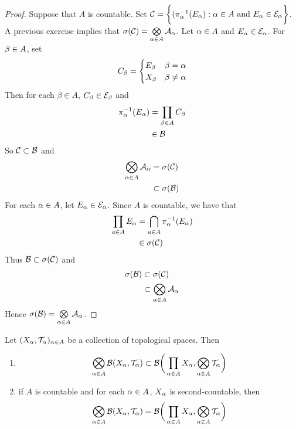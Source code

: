 \documentclass{book}
\begin{document}
 	\begin{proof}
 		Suppose that $A$ is countable. Set $\mathcal{C} =  \bigg \{ (\pi_{\alpha}^{-1}(E_{\alpha}): \alpha \in A \text{ and }E_{\alpha} \in \mathcal{E}_{\alpha} \bigg \}$. A previous exercise implies that $\sigma(\mathcal{C}) = \bigotimes\limits_{\alpha \in A} \mathcal{A}_{\alpha}$. Let $\alpha \in A$ and $E_{\alpha} \in \mathcal{E}_{\alpha}$. For $\beta \in A$, set 
 		\[
 		C_{\beta} = 
 		\begin{cases}
 			E_{\beta} & \beta = \alpha \\
 			X_{\beta} & \beta \neq \alpha
 		\end{cases}
 		\]
 		Then for each $\beta \in A$, $C_{\beta} \in \mathcal{E}_{\beta}$ and
 		\begin{align*}
 			\pi_{\alpha}^{-1}(E_{\alpha}) 
 			& = \prod_{\beta \in A} C_{\beta} \\
 			& \in \mathcal{B}
 		\end{align*}
 		So $\mathcal{C} \subset \mathcal{B}$ and 
 		\begin{align*}
 			\bigotimes\limits_{\alpha \in A} \mathcal{A}_{\alpha}
 			& = \sigma(\mathcal{C}) \\
 			& \subset \sigma(\mathcal{B})
 		\end{align*}
 		For each $\alpha \in A$, let $E_{\alpha} \in \mathcal{E}_{\alpha}$. Since $A$ is countable, we have that 
 		\begin{align*}
 			\prod_{a \in A} E_{\alpha} 
 			& = \bigcap_{a \in A} \pi_{\alpha}^{-1}(E_{\alpha}) \\
 			& \in \sigma(\mathcal{C}) 
 		\end{align*}
 		Thus $\mathcal{B} \subset \sigma(\mathcal{C})$ and 
 		\begin{align*}
 			\sigma(\mathcal{B})
 			& \subset \sigma(\mathcal{C}) \\ 
 			& \subset \bigotimes\limits_{\alpha \in A} \mathcal{A}_{\alpha} 
 		\end{align*}
 		Hence $\sigma(\mathcal{B}) = \bigotimes\limits_{\alpha \in A} \mathcal{A}_{\alpha}$.
 	\end{proof}
 
 	\begin{ex} 
 		Let $(X_{\alpha}, \mathcal{T}_{\alpha})_{\alpha \in A}$ be a collection of topological spaces. Then 
 		\begin{enumerate}
 			\item $$\bigotimes\limits_{\alpha \in A}  \mathcal{B}(X_{\alpha}, \mathcal{T}_{\alpha}) \subset \mathcal{B} \bigg( \prod_{\alpha \in A} X_{\alpha}, \bigotimes_{\alpha \in A} \mathcal{T}_{\alpha} \bigg)$$
 			\item if $A$ is countable and for each $\alpha \in A$, $X_{\alpha}$ is second-countable, then $$\bigotimes\limits_{\alpha \in A}  \mathcal{B}(X_{\alpha}, \mathcal{T}_{\alpha}) = \mathcal{B} \bigg( \prod_{\alpha \in A} X_{\alpha}, \bigotimes_{\alpha \in A} \mathcal{T}_{\alpha} \bigg)$$
 		\end{enumerate}
 	\end{ex}
 
\end{document}
